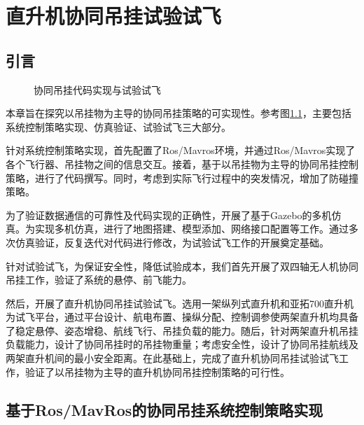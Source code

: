 \chapter{直升机协同吊挂试验试飞}
\section{引言}
\begin{figure}[htb!]
    \centering
    
    \caption{协同吊挂代码实现与试验试飞}
    \label{chap7_fig_1}
\end{figure}
本章旨在探究以吊挂物为主导的协同吊挂策略的可实现性。参考图\ref{chap7_fig_1}，主要包括系统控制策略实现、仿真验证、试验试飞三大部分。

针对系统控制策略实现，首先配置了Ros/Mavros环境，并通过Ros/Mavros实现了各个飞行器、吊挂物之间的信息交互。接着，基于以吊挂物为主导的协同吊挂控制策略，进行了代码撰写。同时，考虑到实际飞行过程中的突发情况，增加了防碰撞策略。

为了验证数据通信的可靠性及代码实现的正确性，开展了基于Gazebo的多机仿真。为实现多机仿真，进行了地图搭建、模型添加、网络接口配置等工作。通过多次仿真验证，反复迭代对代码进行修改，为试验试飞工作的开展奠定基础。

针对试验试飞，为保证安全性，降低试验成本，我们首先开展了双四轴无人机协同吊挂工作，验证了系统的悬停、前飞能力。

然后，开展了直升机协同吊挂试验试飞。选用一架纵列式直升机和亚拓700直升机为试飞平台，通过平台设计、航电布置、操纵分配、控制调参使两架直升机均具备了稳定悬停、姿态增稳、航线飞行、吊挂负载的能力。随后，针对两架直升机吊挂负载能力，设计了协同吊挂时的吊挂物重量；考虑安全性，设计了协同吊挂航线及两架直升机间的最小安全距离。在此基础上，完成了直升机协同吊挂试验试飞工作，验证了以吊挂物为主导的直升机协同吊挂控制策略的可行性。

\section{基于Ros/MavRos的协同吊挂系统控制策略实现}

